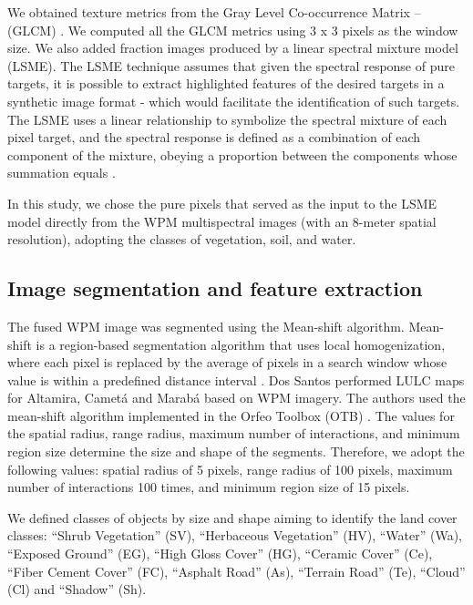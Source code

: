 \documentclass[preprint, 3p,
authoryear]{elsarticle} %
\begin{document}
We obtained texture metrics from the Gray Level Co-occurrence Matrix --
(GLCM) \citep{Haralick1973}. We computed all the GLCM metrics using 3 x
3 pixels as the window size. We also added fraction images produced by a
linear spectral mixture model (LSME). The LSME technique assumes that
given the spectral response of pure targets, it is possible to extract
highlighted features of the desired targets in a synthetic image format
- which would facilitate the identification of such targets. The LSME
uses a linear relationship to symbolize the spectral mixture of each
pixel target, and the spectral response is defined as a combination of
each component of the mixture, obeying a proportion between the
components whose summation equals \citep{Shimabukuro2019}.

In this study, we chose the pure pixels that served as the input to the
LSME model directly from the WPM multispectral images (with an 8-meter
spatial resolution), adopting the classes of vegetation, soil, and
water.

\hypertarget{image-segmentation-and-feature-extraction}{%
\subsection{Image segmentation and feature
extraction}\label{image-segmentation-and-feature-extraction}}

The fused WPM image was segmented using the Mean-shift algorithm.
Mean-shift is a region-based segmentation algorithm that uses local
homogenization, where each pixel is replaced by the average of pixels in
a search window whose value is within a predefined distance interval
\citep{Comaniciu1997}. Dos Santos performed LULC maps for Altamira,
Cametá and Marabá based on WPM imagery. The authors used the mean-shift
algorithm implemented in the Orfeo Toolbox (OTB) \citep{Grizonnet2017}.
The values for the spatial radius, range radius, maximum number of
interactions, and minimum region size determine the size and shape of
the segments. Therefore, we adopt the following values: spatial radius
of 5 pixels, range radius of 100 pixels, maximum number of interactions
100 times, and minimum region size of 15 pixels.

We defined classes of objects by size and shape aiming to identify the
land cover classes: ``Shrub Vegetation'' (SV), ``Herbaceous Vegetation''
(HV), ``Water'' (Wa), ``Exposed Ground'' (EG), ``High Gloss Cover''
(HG), ``Ceramic Cover'' (Ce), ``Fiber Cement Cover'' (FC), ``Asphalt
Road'' (As), ``Terrain Road'' (Te), ``Cloud'' (Cl) and ``Shadow'' (Sh).
\end{document}
